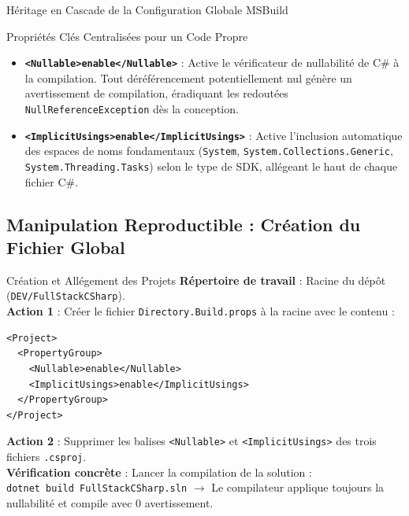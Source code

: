 \begin{schemabox}{Héritage en Cascade de la Configuration Globale MSBuild}
\begin{center}
\end{center}
\end{schemabox}

\vspace{0.2cm}

\begin{bestpracticebox}{Propriétés Clés Centralisées pour un Code Propre}
\begin{itemize}
    \item \textbf{\texttt{<Nullable>enable</Nullable>}} : Active le vérificateur de nullabilité de C\# à la compilation. Tout déréférencement potentiellement nul génère un avertissement de compilation, éradiquant les redoutées \texttt{NullReferenceException} dès la conception.
    \item \textbf{\texttt{<ImplicitUsings>enable</ImplicitUsings>}} : Active l'inclusion automatique des espaces de noms fondamentaux (\texttt{System}, \texttt{System.Collections.Generic}, \texttt{System.Threading.Tasks}) selon le type de SDK, allégeant le haut de chaque fichier C\#.
\end{itemize}
\end{bestpracticebox}

\newpage

\subsection*{Manipulation Reproductible : Création du Fichier Global}

\begin{bestpracticebox}{Création et Allégement des Projets}
\textbf{Répertoire de travail} : Racine du dépôt (\texttt{DEV/FullStackCSharp}).\\[2pt]
\textbf{Action 1} : Créer le fichier \texttt{Directory.Build.props} à la racine avec le contenu :
\begin{verbatim}
<Project>
  <PropertyGroup>
    <Nullable>enable</Nullable>
    <ImplicitUsings>enable</ImplicitUsings>
  </PropertyGroup>
</Project>
\end{verbatim}
\textbf{Action 2} : Supprimer les balises \texttt{<Nullable>} et \texttt{<ImplicitUsings>} des trois fichiers \texttt{.csproj}.\\[2pt]
\textbf{Vérification concrète} : Lancer la compilation de la solution :\\
\texttt{dotnet build FullStackCSharp.sln} $\longrightarrow$ Le compilateur applique toujours la nullabilité et compile avec 0 avertissement.
\end{bestpracticebox}

